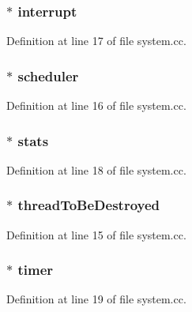 \subsubsection[{interrupt}]{$\ast$ interrupt}\label{system_8cc_a3fd5c19f3e649bec3c8bd658cd258aca}


Definition at line 17 of file system.\+cc.

\subsubsection[{scheduler}]{$\ast$ scheduler}\label{system_8cc_a0af0114c406f687347d551154125b00c}


Definition at line 16 of file system.\+cc.

\subsubsection[{stats}]{$\ast$ stats}\label{system_8cc_a88dfa3573015231289dd03a4bbec3ca3}


Definition at line 18 of file system.\+cc.

\subsubsection[{thread\+To\+Be\+Destroyed}]{$\ast$ thread\+To\+Be\+Destroyed}\label{system_8cc_a50e41e8be26bc4469871db0c3324b7e4}


Definition at line 15 of file system.\+cc.

\subsubsection[{timer}]{$\ast$ timer}\label{system_8cc_ad59f2b60cccbf7bd6a43003017d1d01a}


Definition at line 19 of file system.\+cc.

